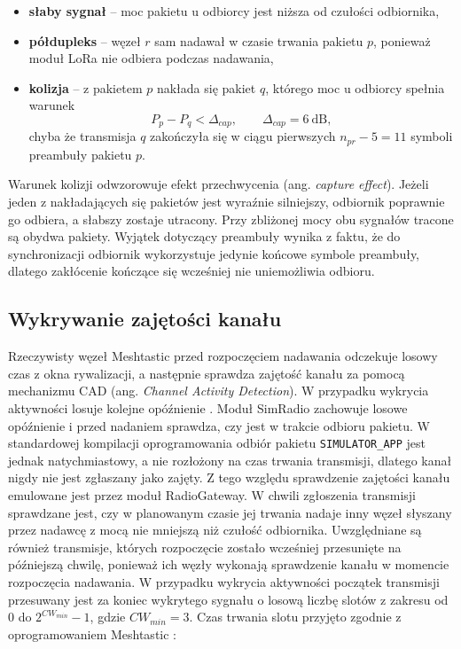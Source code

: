 \begin{itemize}
\item \textbf{słaby sygnał} -- moc pakietu u odbiorcy jest niższa od czułości odbiornika,
\item \textbf{półdupleks} -- węzeł \(r\) sam nadawał w czasie trwania pakietu \(p\), ponieważ moduł LoRa nie odbiera podczas nadawania,
\item \textbf{kolizja} -- z pakietem \(p\) nakłada się pakiet \(q\), którego moc u odbiorcy spełnia warunek
\begin{equation}\label{eq:capture}
P_p - P_q < \Delta_{cap}, \qquad \Delta_{cap} = 6~\textrm{dB},
\end{equation}
chyba że transmisja \(q\) zakończyła się w ciągu pierwszych \(n_{pr} - 5 = 11\) symboli preambuły pakietu \(p\).
\end{itemize}

Warunek kolizji odwzorowuje efekt przechwycenia (ang. \textit{capture effect}). Jeżeli jeden z nakładających się pakietów jest wyraźnie silniejszy, odbiornik poprawnie go odbiera, a słabszy zostaje utracony. Przy zbliżonej mocy obu sygnałów tracone są obydwa pakiety. Wyjątek dotyczący preambuły wynika z faktu, że do synchronizacji odbiornik wykorzystuje jedynie końcowe symbole preambuły, dlatego zakłócenie kończące się wcześniej nie uniemożliwia odbioru.

\subsection{Wykrywanie zajętości kanału}

Rzeczywisty węzeł Meshtastic przed rozpoczęciem nadawania odczekuje losowy czas z okna rywalizacji, a następnie sprawdza zajętość kanału za pomocą mechanizmu CAD (ang. \textit{Channel Activity Detection}). W przypadku wykrycia aktywności losuje kolejne opóźnienie \cite{meshtastic_firmware}. Moduł SimRadio zachowuje losowe opóźnienie i przed nadaniem sprawdza, czy jest w trakcie odbioru pakietu. W standardowej kompilacji oprogramowania odbiór pakietu \texttt{SIMULATOR\_APP} jest jednak natychmiastowy, a nie rozłożony na czas trwania transmisji, dlatego kanał nigdy nie jest zgłaszany jako zajęty. Z tego względu sprawdzenie zajętości kanału emulowane jest przez moduł RadioGateway. W chwili zgłoszenia transmisji sprawdzane jest, czy w planowanym czasie jej trwania nadaje inny węzeł słyszany przez nadawcę z mocą nie mniejszą niż czułość odbiornika. Uwzględniane są również transmisje, których rozpoczęcie zostało wcześniej przesunięte na późniejszą chwilę, ponieważ ich węzły wykonają sprawdzenie kanału w momencie rozpoczęcia nadawania. W przypadku wykrycia aktywności początek transmisji przesuwany jest za koniec wykrytego sygnału o losową liczbę slotów z zakresu od 0 do \(2^{CW_{min}} - 1\), gdzie \(CW_{min} = 3\). Czas trwania slotu przyjęto zgodnie z oprogramowaniem Meshtastic \cite{meshtastic_firmware}:

